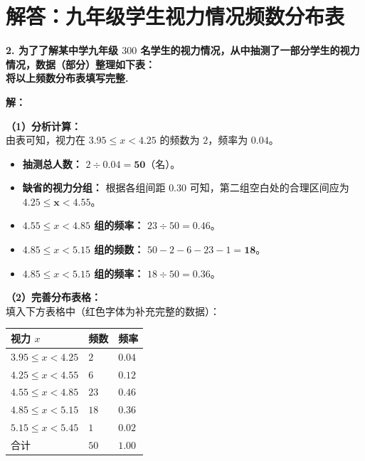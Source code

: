 \documentclass[12pt, a4paper]{ctexrep}
\begin{document}
\newpage

\section{解答：九年级学生视力情况频数分布表}

\vspace{0.6cm}

\textbf{2. 为了了解某中学九年级 $300$ 名学生的视力情况，从中抽测了一部分学生的视力情况，数据（部分）整理如下表：}\\
\textbf{将以上频数分布表填写完整.}

\vspace{0.4cm}

\textbf{解：}

\textbf{（1）分析计算：} \\
由表可知，视力在 $3.95 \leqslant x < 4.25$ 的频数为 $2$，频率为 $0.04$。
\begin{itemize}
  \item \textbf{抽测总人数：} $2 \div 0.04 = \boldsymbol{50}$（名）。
  \item \textbf{缺省的视力分组：} 根据各组间距 $0.30$ 可知，第二组空白处的合理区间应为 $\boldsymbol{4.25 \leqslant x < 4.55}$。
  \item \textbf{$4.55 \leqslant x < 4.85$ 组的频率：} $23 \div 50 = \boldsymbol{0.46}$。
  \item \textbf{$4.85 \leqslant x < 5.15$ 组的频数：} $50 - 2 - 6 - 23 - 1 = \boldsymbol{18}$。
  \item \textbf{$4.85 \leqslant x < 5.15$ 组的频率：} $18 \div 50 = \boldsymbol{0.36}$。
\end{itemize}

\textbf{（2）完善分布表格：} \\
填入下方表格中（红色字体为补充完整的数据）：

\vspace{0.2cm}
\begin{center}
\renewcommand{\arraystretch}{1.5}
\begin{tabular}{|>{\centering\arraybackslash}p{4cm}|>{\centering\arraybackslash}p{3cm}|>{\centering\arraybackslash}p{3cm}|}
  \hline
  \cellcolor{gray!15} 视力 $x$ & \cellcolor{gray!15} 频数 & \cellcolor{gray!15} 频率 \\
  \hline
  $3.95 \leqslant x < 4.25$ & $2$ & $0.04$ \\
  \hline
  \textbf{\textcolor{red!70!black}{$4.25 \leqslant x < 4.55$}} & $6$ & $0.12$ \\
  \hline
  $4.55 \leqslant x < 4.85$ & $23$ & \textbf{\textcolor{red!70!black}{$0.46$}} \\
  \hline
  $4.85 \leqslant x < 5.15$ & \textbf{\textcolor{red!70!black}{$18$}} & \textbf{\textcolor{red!70!black}{$0.36$}} \\
  \hline
  $5.15 \leqslant x < 5.45$ & $1$ & $0.02$ \\
  \hline
  合计 & \textbf{\textcolor{red!70!black}{$50$}} & $1.00$ \\
  \hline
\end{tabular}
\end{center}
\end{document}
